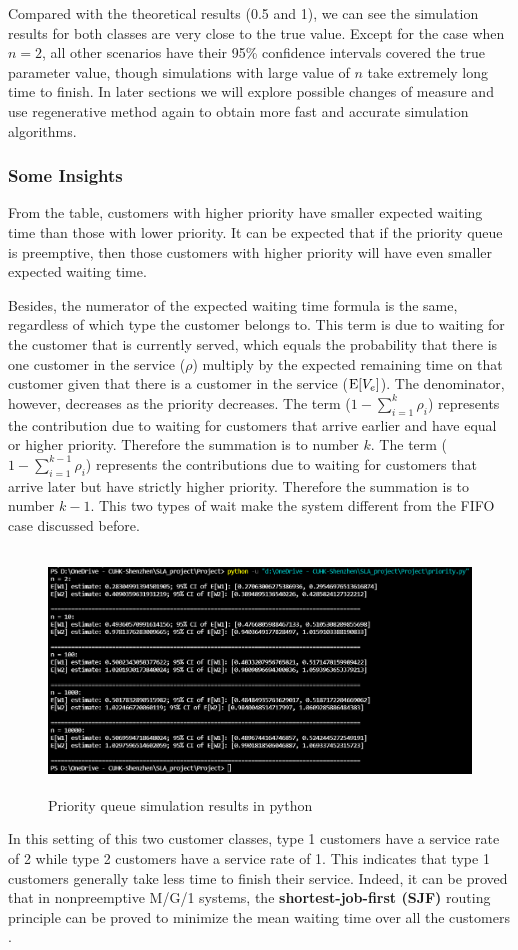 \documentclass{article}
\begin{document}
Compared with the theoretical results (0.5 and 1), we can see the simulation results for both classes are very close to the true value. Except for the case when $n=2$, all other scenarios have their 95\% confidence intervals covered the true parameter value, though simulations with large value of $n$ take extremely long time to finish.
In later sections we will explore possible changes of measure and use regenerative method again to obtain more fast and accurate simulation algorithms.


\subsubsection{Some Insights}

From the table, customers with higher priority have smaller expected waiting time than those with lower priority. It can be expected that if the priority queue is preemptive, then those customers with higher priority will have even smaller expected waiting time. 

Besides, the numerator of the expected waiting time formula is the same, regardless of which type the customer belongs to. This term is due to waiting for the customer that is currently served, which equals the probability that there is one customer in the service ($\rho$) multiply by the expected remaining time on that customer given that there is a customer in the service (${\rm E}[V_e]$). 
The denominator, however, decreases as the priority decreases. The term ($1-\sum_{i=1}^k \rho_i$) represents the contribution due to waiting for customers that arrive earlier and have equal or higher priority. Therefore the summation is to number $k$. The term ($1-\sum_{i=1}^{k-1} \rho_i$) represents the contributions due to waiting for customers that arrive later but have strictly higher priority. Therefore the summation is to number $k-1$. This two types of wait make the system different from the FIFO case discussed before. 
\begin{figure}[H]
	\centering
	\includegraphics[height=6.4cm]{./figures/priority_result.png}
	\caption{Priority queue simulation results in python}
	\label{fig:fig2}
\end{figure}
In this setting of this two customer classes, type 1 customers have a service rate of 2 while type 2 customers have a service rate of 1. This indicates that type 1 customers generally take less time to finish their service. Indeed, it can be proved that in nonpreemptive M/G/1 systems, the \textbf{shortest-job-first (SJF)} routing principle can be proved to minimize the mean waiting time over all the customers \citep{harchol2013performance}. 	
\end{document}

